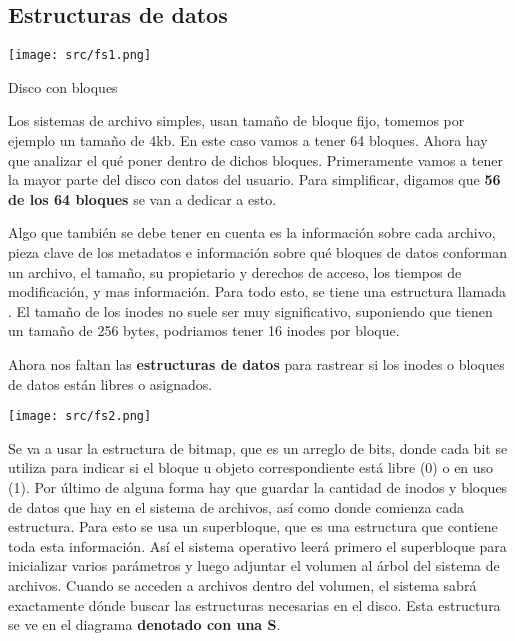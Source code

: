 \documentclass[openany]{book}
\begin{document}
\subsection{Estructuras de datos}

\begin{floatingfigure}[r]{0.5\textwidth}
    \texttt{[image: src/fs1.png]}
    \caption{Disco con bloques}
\end{floatingfigure}

Los sistemas de archivo simples, usan \colorbox{green!20}{tamaño} de bloque \colorbox{green!20}{fijo}, tomemos por ejemplo un tamaño de 4kb. En este caso vamos a tener 64 bloques. Ahora hay que analizar el \colorbox{green!20}{qué} poner dentro de dichos bloques. Primeramente vamos a tener la mayor parte del disco con \colorbox{green!20}{datos del usuario}. Para simplificar, digamos que \textbf{56 de los 64 bloques} se van a dedicar a esto. 

Algo que también se debe tener en cuenta es la \colorbox{green!20}{información} sobre cada archivo, pieza clave de los \colorbox{green!20}{metadatos} e información sobre \colorbox{green!20}{qué bloques} de datos conforman un archivo, el \colorbox{green!20}{tamaño}, su \colorbox{green!20}{propietario} y \colorbox{green!20}{derechos} de acceso, los \colorbox{green!20}{tiempos de modificación}, y mas información. Para todo esto, se tiene una estructura llamada . El tamaño de los inodes no suele ser muy significativo, suponiendo que tienen un tamaño de 256 bytes, podriamos tener \colorbox{green!20}{16 inodes por bloque}.

Ahora nos faltan las \textbf{estructuras de datos} para rastrear si los inodes o bloques de datos están \colorbox{green!20}{libres} o \colorbox{green!20}{asignados}.

\begin{floatingfigure}[l]{0.5\textwidth}
    \texttt{[image: src/fs2.png]}
\end{floatingfigure}

Se va a usar la estructura de \colorbox{green!20}{bitmap}, que es un arreglo de bits, donde cada bit se utiliza para indicar si el bloque u objeto correspondiente está \colorbox{green!20}{libre (0)} o \colorbox{green!20}{en uso (1)}. Por último de alguna forma hay que guardar la cantidad de inodos y bloques de datos que hay en el sistema de archivos, así como donde comienza cada estructura. Para esto se usa un \colorbox{green!20}{superbloque}, que es una estructura que contiene toda esta información. Así el sistema operativo leerá primero el superbloque para inicializar varios parámetros y luego adjuntar el volumen al árbol del sistema de archivos. Cuando se acceden a archivos dentro del volumen, el sistema sabrá exactamente dónde buscar las estructuras necesarias en el disco. Esta estructura se ve en el diagrama \textbf{denotado con una S}.
\end{document}
